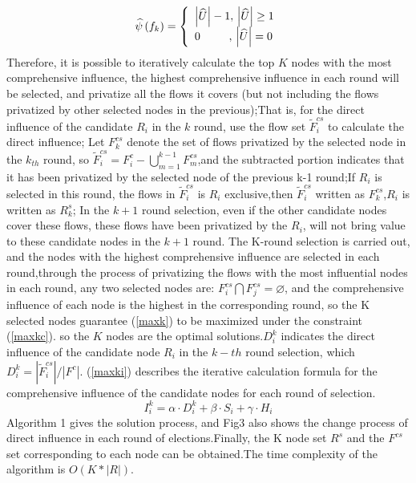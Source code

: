 \documentclass[conference,compsoc]{IEEEtran}
\begin{document}
\begin{equation}
\widehat{\psi} \left( {{f_k}} \right) = \left\{ \begin{array}{l}
\left| \widehat{U} \right| - 1,{\rm{    }}\left| \widehat{U} \right| \ge 1\\
{\rm{   }}0\quad \quad \; \; ,\, \left| \widehat{U} \right| = 0
\end{array} \right.
\label{maxkr}
\end{equation}
Therefore, it is possible to iteratively calculate the top $K$ nodes with the most comprehensive influence, the highest comprehensive influence in each round will be selected, and privatize all the flows it covers (but not including the flows privatized by other selected nodes in the previous);That is, for the direct influence of the candidate $R_i$ in the $k$ round, use the flow set $\widetilde{F}^{cs}_i$ to calculate the direct influence; Let $F_k^{cs}$ denote the set of flows privatized by the selected node in the $k_{th}$ round, so $\widetilde{F}^{cs}_i = F_i^c- \bigcup_{m=1}^{k-1}F_m^{cs}$,and the subtracted portion indicates that it has been privatized by the selected node of the previous k-1 round;If $R_i$ is selected in this round, the flows in $\widetilde{F}^{cs}_i$ is $R_i$ exclusive,then $\widetilde{F}^{cs}_i$ written as $F^{cs}_k$,$R_i$ is written as $R^s_k$; In the $k+1$ round selection, even if the other candidate nodes cover these flows, these flows have been privatized by the $R_i$, will not bring value to these candidate nodes in the $k+1$ round. The K-round selection is carried out, and the nodes with the highest comprehensive influence are selected in each round,through the process of privatizing the flows with the most influential nodes in each round, any two selected nodes are: $F^{cs}_i \bigcap F^{cs}_j = \varnothing$, and the comprehensive influence of each node is the highest in the corresponding round, so the K selected nodes guarantee (\ref{maxk}) to be maximized under the constraint (\ref{maxkc}). so the $K$ nodes are the optimal solutions.$D_i^k$ indicates the direct influence of the candidate node $R_i$ in the $k-th$ round selection, which $D_i^k = |\widetilde{F}^{cs}_i|/{\left| F^c \right|}$. (\ref{maxki}) describes the iterative calculation formula for the comprehensive influence of the candidate nodes for each round of selection.
\begin{equation}
I_{i}^{k}=\alpha \cdot D_{i}^{k}+\beta \cdot {{S}_{i}}+\gamma \cdot {{H}_{i}}
\label{maxki}
\end{equation}
Algorithm 1 gives the solution process, and Fig3 also shows the change process of direct influence in each round of elections.Finally, the K node set $R^s$ and the $F^{cs}$ set corresponding to each node can be obtained.The time complexity of the algorithm is $O(K*|R|)$.
\end{document}
